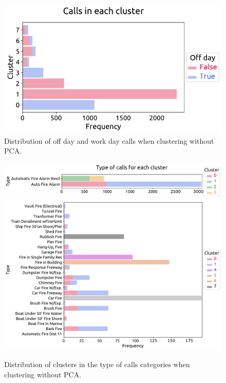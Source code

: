 \documentclass[12pt,a4paper]{article}
\begin{document}
\begin{figure}[ht!]
\centering
\includegraphics[scale=0.6]{figs/STORY_NO_PCA_off_days.pdf}
\caption{Distribution of off day and work day calls when clustering without PCA.}
\label{STORY_NO_PCA_off_days}
\end{figure}

\begin{figure}[ht!]
\centering
\includegraphics[scale=0.52]{figs/STORY_NO_PCA_type_1.pdf}
\includegraphics[scale=0.52]{figs/STORY_NO_PCA_type_2.pdf}
\caption{Distribution of clusters in the type of calls categories when clustering without PCA.}
\label{STORY_NO_PCA_type}
\end{figure}

\end{document}
